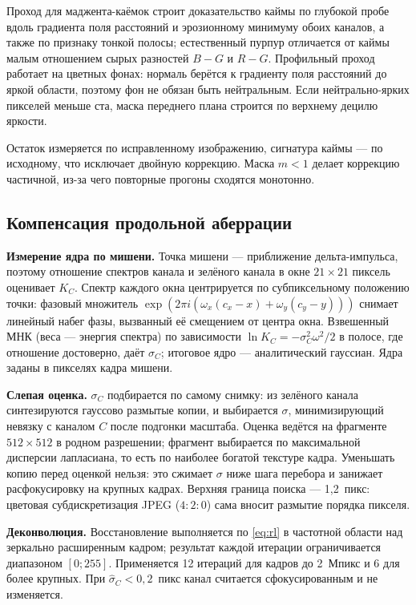 \documentclass[a4paper,14pt,oneside]{extreport}
\begin{document}
Проход для маджента-каёмок строит доказательство каймы по глубокой пробе
вдоль градиента поля расстояний и эрозионному минимуму обоих каналов, а
также по признаку тонкой полосы; естественный пурпур отличается от каймы
малым отношением сырых разностей $B-G$ и $R-G$. Профильный проход работает
на цветных фонах: нормаль берётся к градиенту поля расстояний до яркой
области, поэтому фон не обязан быть нейтральным. Если нейтрально-ярких
пикселей меньше ста, маска переднего плана строится по верхнему децилю
яркости.

Остаток измеряется по исправленному изображению, сигнатура каймы --- по
исходному, что исключает двойную коррекцию. Маска $m<1$ делает коррекцию
частичной, из-за чего повторные прогоны сходятся монотонно.

\subsection{Компенсация продольной аберрации}

\textbf{Измерение ядра по мишени.} Точка мишени --- приближение
дельта-импульса, поэтому отношение спектров канала и зелёного канала в
окне $21\times21$ пиксель оценивает $K_C$. Спектр каждого окна
центрируется по субпиксельному положению точки: фазовый множитель
$\exp(2\pi i(\omega_x(c_x-x)+\omega_y(c_y-y)))$ снимает линейный набег фазы,
вызванный её смещением от центра окна. Взвешенный МНК (веса --- энергия
спектра) по зависимости $\ln K_C=-\sigma_C^2\omega^2/2$ в полосе, где
отношение достоверно, даёт $\sigma_C$; итоговое ядро --- аналитический
гауссиан. Ядра заданы в пикселях кадра мишени.

\textbf{Слепая оценка.} $\sigma_C$ подбирается по самому снимку: из зелёного канала
синтезируются гауссово размытые копии, и выбирается $\sigma$, минимизирующий
невязку с каналом $C$ после подгонки масштаба. Оценка ведётся на фрагменте
$512\times512$ в родном разрешении; фрагмент выбирается по максимальной
дисперсии лапласиана, то есть по наиболее богатой текстуре кадра. Уменьшать копию
перед оценкой нельзя: это сжимает $\sigma$ ниже шага перебора и
занижает расфокусировку на крупных кадрах. Верхняя граница поиска ---
1{,}2~пикс: цветовая субдискретизация JPEG ($4{:}2{:}0$) сама вносит
размытие порядка пикселя.

\textbf{Деконволюция.} Восстановление выполняется по \eqref{eq:rl} в
частотной области над зеркально расширенным кадром; результат каждой
итерации ограничивается диапазоном $[0;255]$. Применяется 12 итераций для
кадров до 2~Мпикс и 6 для более крупных. При $\hat\sigma_C<0{,}2$~пикс
канал считается сфокусированным и не изменяется.
\end{document}

